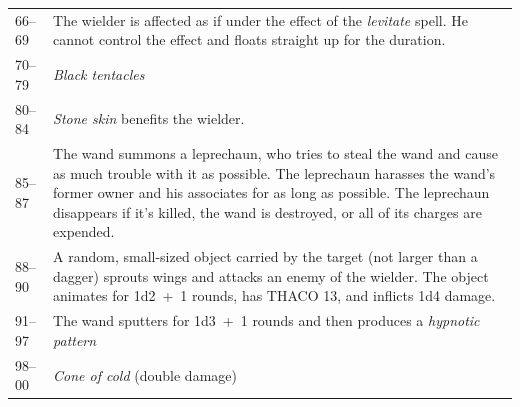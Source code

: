 \begin{longtable}{|p{}|p{}|}
\rowcolor[gray]{.9}66--69	& The wielder is affected as if under the effect of the \textit{levitate} spell.  He cannot control the effect and floats straight up for the duration. \\
70--79	& \textit{Black tentacles} \\
\rowcolor[gray]{.9}80--84	& \textit{Stone skin} benefits the wielder. \\
85--87	& The wand summons a leprechaun, who tries to steal the wand and cause as much trouble with it as possible.  The leprechaun harasses the wand's former owner and his associates for as long as possible.  The leprechaun disappears if it's killed, the wand is destroyed, or all of its charges are expended. \\
\rowcolor[gray]{.9}88--90	& A random, small-sized object carried by the target (not larger than a dagger) sprouts wings and attacks an enemy of the wielder.  The object animates for 1d2~+~1 rounds, has THACO 13, and inflicts 1d4 damage. \\
91--97	& The wand sputters for 1d3~+~1 rounds and then produces a \textit{hypnotic pattern} \\
\rowcolor[gray]{.9}98--00	& \textit{Cone of cold} (double damage) \\
\end{longtable}

